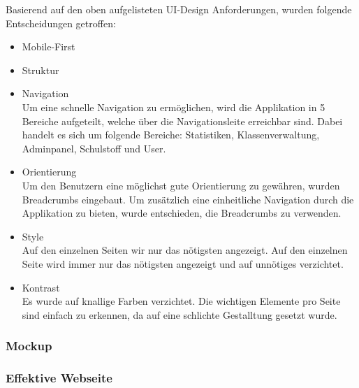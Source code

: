 Basierend auf den oben aufgelisteten UI-Design Anforderungen, wurden folgende Entscheidungen getroffen:

\begin{itemize}
	\item Mobile-First \\
	
	\item Struktur \\
		
	\item Navigation \\
		Um eine schnelle Navigation zu ermöglichen, wird die Applikation in 5 Bereiche aufgeteilt, welche über die Navigationsleite erreichbar sind. Dabei handelt es sich um folgende Bereiche: Statistiken, Klassenverwaltung, Adminpanel, Schulstoff und User. 
	\item Orientierung \\
		Um den Benutzern eine möglichst gute Orientierung zu gewähren, wurden Breadcrumbs eingebaut. Um zusätzlich eine einheitliche Navigation durch die Applikation zu bieten, wurde entschieden, die Breadcrumbs zu verwenden.
	\item Style \\
		Auf den einzelnen Seiten wir nur das nötigsten angezeigt. Auf den einzelnen Seite wird immer nur das nötigsten angezeigt und auf unnötiges verzichtet.
	\item Kontrast \\
		Es wurde auf knallige Farben verzichtet. Die wichtigen Elemente pro Seite sind einfach zu erkennen, da auf eine schlichte Gestalltung gesetzt wurde.
\end{itemize}



\subsubsection*{Mockup}


\subsubsection*{Effektive Webseite}

\newpage